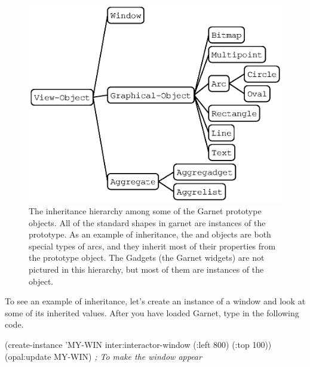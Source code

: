 \begin{figure}
  \begin{center}
    \includegraphics{opal-inheritance}
  \end{center}
\caption{The inheritance hierarchy among some of the Garnet prototype objects.
All of the standard shapes in garnet are instances of the
 prototype.  As an example of inheritance, the
 and  objects are both special types of arcs, and
they inherit most of their properties from the  prototype
object.  The Gadgets (the Garnet widgets) are not pictured in this
hierarchy, but most of them are instances of the  object.}
\end{figure}

To see an example of inheritance, let's create an instance of a window
and look at some of its inherited values.  After you have loaded Garnet,
type in the following code.

\begin{programexample}
(create-instance 'MY-WIN inter:interactor-window
   (:left 800) (:top 100))
(opal:update MY-WIN)  {\it ; To make the window appear}
\end{programexample}

